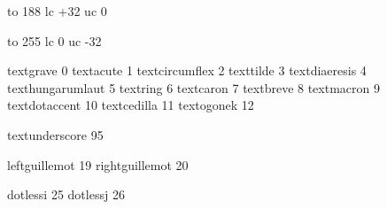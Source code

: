 

\startmapping[ec]




 to 188 lc +32 uc 0


 to 255 lc 0 uc -32


\stopmapping

\startencoding[ec][ec] %

 textgrave         0
 textacute         1
 textcircumflex    2
 texttilde         3
 textdiaeresis     4
 texthungarumlaut  5
 textring          6
 textcaron         7
 textbreve         8
 textmacron        9
 textdotaccent    10
 textcedilla      11 
 textogonek       12 

 textunderscore   95 

 leftguillemot    19
 rightguillemot   20

 dotlessi         25
 dotlessj         26

